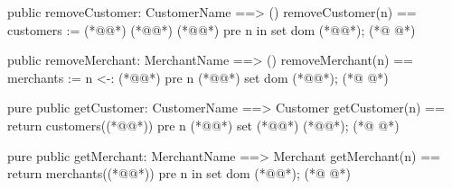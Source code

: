 \begin{vdmpp}[breaklines=true]
 public removeCustomer: CustomerName ==> ()
 removeCustomer(n) == customers := {(*@@*)} (*@\vdmnotcovered{<-:}@*) (*@@*)
 pre n in set dom (*@@*);
(*@
\label{removeMerchant:47}
@*)
 
 public removeMerchant: MerchantName ==> ()
 removeMerchant(n) == merchants := {n} <-: (*@@*)
 pre n (*@@*) set dom (*@@*); 
(*@
\label{getCustomer:51}
@*)
 
 pure public getCustomer: CustomerName ==> Customer
 getCustomer(n) == return customers((*@@*))
 pre n (*@@*) set (*@@*) (*@@*);
(*@
\label{getMerchant:55}
@*)
 
 pure public getMerchant: MerchantName ==> Merchant
 getMerchant(n) == return merchants((*@@*))
 pre n in set dom (*@@*); 
(*@
\label{purchaseProduct:59}
@*)
 

\end{vdmpp}
